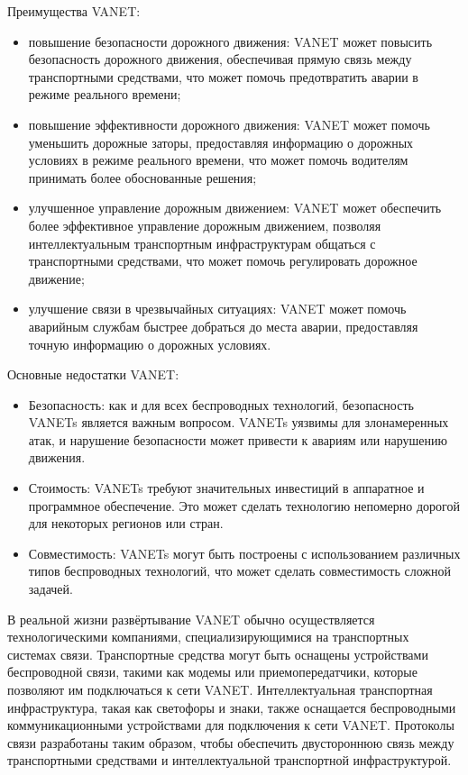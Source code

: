 Преимущества VANET:
\begin{itemize}
\item повышение безопасности дорожного движения: VANET может повысить
  безопасность дорожного движения, обеспечивая прямую связь между
  транспортными средствами, что может помочь предотвратить аварии в
  режиме реального времени;
\item повышение эффективности дорожного движения: VANET может помочь
  уменьшить дорожные заторы, предоставляя информацию о дорожных
  условиях в режиме реального времени, что может помочь водителям
  принимать более обоснованные решения;
\item улучшенное управление дорожным движением: VANET может обеспечить
  более эффективное управление дорожным движением, позволяя
  интеллектуальным транспортным инфраструктурам общаться с
  транспортными средствами, что может помочь регулировать дорожное
  движение; 
\item улучшение связи в чрезвычайных ситуациях: VANET может помочь
  аварийным службам быстрее добраться до места аварии, предоставляя
  точную информацию о дорожных условиях.
\end{itemize}


Основные недостатки VANET:
\begin{itemize}
\item Безопасность: как и для всех беспроводных технологий,
  безопасность VANETs является важным вопросом. VANETs уязвимы для
  злонамеренных атак, и нарушение безопасности может привести к
  авариям или нарушению движения.
\item Стоимость: VANETs требуют значительных инвестиций в аппаратное и
  программное обеспечение. Это может сделать технологию непомерно
  дорогой для некоторых регионов или стран.
\item Совместимость: VANETs могут быть построены с использованием
  различных типов беспроводных технологий, что может сделать
  совместимость сложной задачей.
 \end{itemize}

 В реальной жизни развёртывание VANET обычно осуществляется
 технологическими компаниями, специализирующимися на транспортных
 системах связи. Транспортные средства могут быть оснащены
 устройствами беспроводной связи, такими как модемы или
 приемопередатчики, которые позволяют им подключаться к сети
 VANET. Интеллектуальная транспортная инфраструктура, такая как
 светофоры и знаки, также оснащается беспроводными коммуникационными
 устройствами для подключения к сети VANET. Протоколы связи
 разработаны таким образом, чтобы обеспечить двустороннюю связь между
 транспортными средствами и интеллектуальной транспортной
 инфраструктурой.

